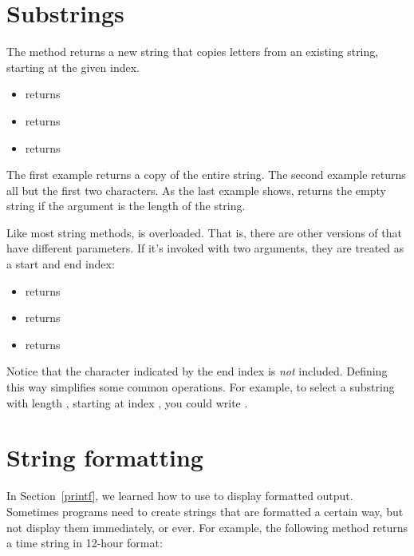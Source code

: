 \section{Substrings}


The  method returns a new string that copies letters from an existing string, starting at the given index.

\begin{itemize}
\item {} returns 
\item {} returns 
\item {} returns 
\end{itemize}

The first example returns a copy of the entire string.
The second example returns all but the first two characters.
As the last example shows,  returns the empty string if the argument is the length of the string.

Like most string methods,  is overloaded.
That is, there are other versions of  that have different parameters.
If it's invoked with two arguments, they are treated as a start and end index:

\begin{itemize}
\item {} returns 
\item {} returns 
\item {} returns 
\end{itemize}

Notice that the character indicated by the end index is {\em not} included.
Defining  this way simplifies some common operations.
For example, to select a substring with length , starting at index , you could write .


\section{String formatting}


In Section~\ref{printf}, we learned how to use  to display formatted output.
Sometimes programs need to create strings that are formatted a certain way, but not display them immediately, or ever.
For example, the following method returns a time string in 12-hour format:

